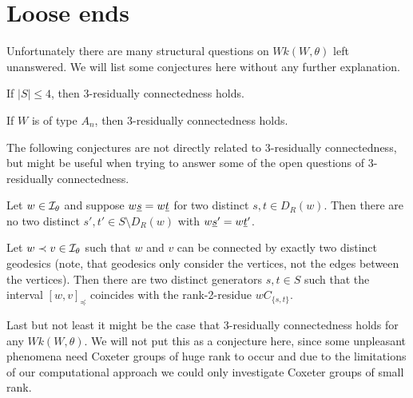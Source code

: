 \chapter{Loose ends}

Unfortunately there are many structural questions on $Wk(W, \theta)$ left unanswered. We will list some conjectures here without any further explanation.

\begin{conj}
	If $|S| \leq 4$, then 3-residually connectedness holds.
\end{conj}

\begin{conj}
	If $W$ is of type $A_n$, then 3-residually connectedness holds.
\end{conj}

The following conjectures are not directly related to 3-residually connectedness, but might be useful when trying to answer some of the open questions of 3-residually connectedness.

\begin{conj}
	Let $w \in \mathcal{I}_{\theta}$ and suppose $w \underline{s} = w \underline{t}$ for two distinct $s,t \in D_R(w)$. Then there are no two distinct $s',t' \in S \setminus D_R(w)$ with $w \underline{s}' = w \underline{t}'$.
\end{conj}

\begin{conj}
	Let $w \prec v \in \mathcal{I}_{\theta}$ such that $w$ and $v$ can be connected by exactly two distinct geodesics (note, that geodesics only consider the vertices, not the edges between the vertices). Then there are two distinct generators $s,t \in S$ such that the interval $[w,v]_\preceq$ coincides with the rank-2-residue $w C_{\{s,t\}}$.
\end{conj}

Last but not least it might be the case that 3-residually connectedness holds for any $Wk(W, \theta)$. We will not put this as a conjecture here, since some unpleasant phenomena need Coxeter groups of huge rank to occur and due to the limitations of our computational approach we could only investigate Coxeter groups of small rank.